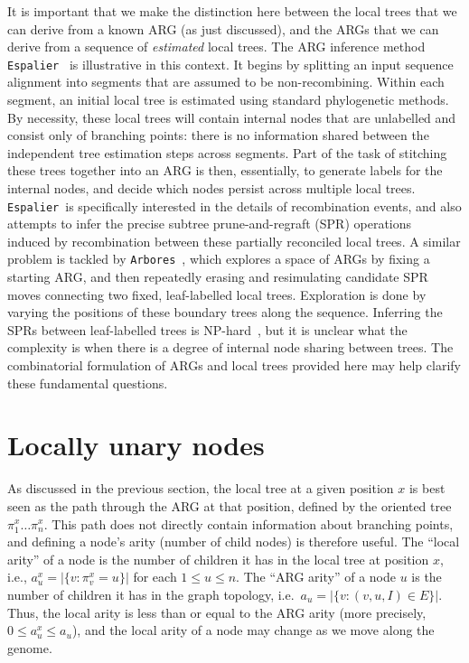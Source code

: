\documentclass{article}
\newcommand{\espalier}[0]{\texttt{Espalier}}
\newcommand{\arbores}[0]{\texttt{Arbores}}
\begin{document}
It is important that we make the distinction here between the local
trees that we can derive from a known ARG (as just discussed),
and the ARGs that we can derive from a sequence of \emph{estimated}
local trees.
The ARG inference method
\espalier~\citep{rasmussen2022espalier} is illustrative in this context.
It begins by splitting an input sequence alignment into
segments that are assumed to be non-recombining. Within
each segment, an initial local tree is estimated using
standard phylogenetic methods. By necessity, these local
trees will contain internal nodes that are unlabelled and
consist only of branching points: there is no information
shared between the independent tree estimation steps
across segments. Part of the task of stitching
these trees together
into an ARG is then, essentially, to generate labels for
the internal nodes, and decide which nodes persist
across multiple local trees.
\espalier\ is specifically interested
in the details of recombination events,
and also attempts to infer
the precise subtree prune-and-regraft (SPR)
operations~\citep{hein1990reconstructing,song2003on,song2006properties}
induced by recombination between these partially reconciled local trees.
A similar problem is tackled by \arbores~\citep{heine2018bridging}, which explores a space of ARGs by fixing a starting ARG, and then repeatedly erasing and resimulating candidate SPR moves connecting two fixed, leaf-labelled local trees.
Exploration is done by varying the positions of these boundary trees along the sequence.
Inferring the SPRs between leaf-labelled trees is
NP-hard~\citep{hein1996complexity,allen2001subtree,bordewich2005computational},
but it is unclear what the complexity is when there
is a degree of internal node sharing between trees.
The combinatorial formulation of ARGs and local trees provided here
may help clarify these fundamental questions.

\section{Locally unary nodes}
\label{sec-locally-unary-edges}
As discussed in the previous section, the local tree at a given position
$x$ is best seen as the path through the ARG at that position, defined
by the oriented tree $\pi^x_1\dots\pi^x_n$. This path does not directly
contain information about branching points, and defining a
node's arity (number of child nodes) is therefore useful.
The ``local arity'' of a node is the number of children it has
in the local tree at position $x$, i.e., $a^x_u = |\{v : \pi^x_v = u\}|$
for each $1 \leq u \leq n$. The ``ARG arity'' of a node $u$ is the
number of children it has in the graph topology, i.e.\
$a_u = |\{v: (v, u, I) \in E\}|$. Thus, the local arity is less than
or equal to the ARG arity (more precisely, $0 \leq a^x_u \leq a_u$),
and the local arity of a node may change as we move along the genome.
\end{document}
